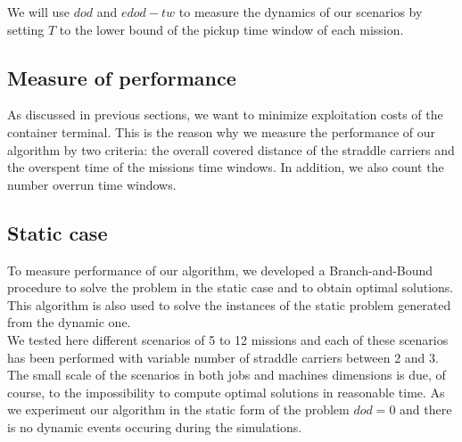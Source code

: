 \documentclass[review]{elsarticle}
\begin{document}
We will use $dod$ and $edod-tw$ to measure the dynamics of our scenarios by setting $T$ to the lower bound of the pickup time window of each mission.

	\subsection{Measure of performance}
As discussed in previous sections, we want to minimize exploitation costs of the container terminal. This is the reason why we measure the performance of our algorithm by two criteria: the overall covered distance of the straddle carriers and the overspent time of the missions time windows. In addition, we also count the number overrun time windows.

	\subsection{Static case}
  To measure performance of our algorithm, we developed a Branch-and-Bound procedure to solve the problem in the static case and to obtain optimal solutions. This algorithm is also used to solve the instances of the static problem generated from the dynamic one.\\

  We tested here different scenarios of 5 to 12 missions and each of these scenarios has been performed with variable number of straddle carriers between 2 and 3. The small scale of the scenarios in both jobs and machines dimensions is due, of course, to the impossibility to compute optimal solutions in reasonable time.
  As we experiment our algorithm in the static form of the problem $dod=0$ and there is no dynamic events occuring during the simulations.
\end{document}
